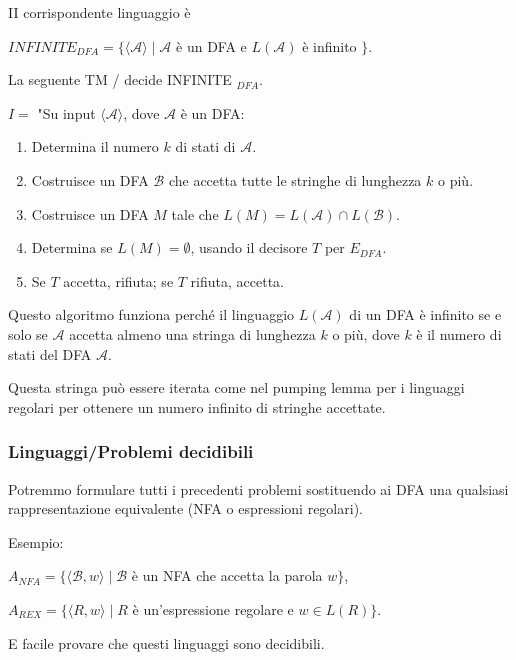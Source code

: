 II corrispondente linguaggio è

$I N F I N I T E_{D F A}=\{\langle\mathcal{A}\rangle \mid \mathcal{A}$ è un DFA e $L(\mathcal{A})$ è infinito $\} .$

\vspace{5mm}

La seguente TM / decide INFINITE $_{D F A}$.

$I=$ "Su input $\langle\mathcal{A}\rangle$, dove $\mathcal{A}$ è un DFA:
\begin{enumerate}
    \item Determina il numero $k$ di stati di $\mathcal{A}$.
    \item Costruisce un DFA $\mathcal{B}$ che accetta tutte le stringhe di lunghezza $k$ o più.
    \item Costruisce un DFA $M$ tale che $L(M)=L(\mathcal{A}) \cap L(\mathcal{B})$.
    \item Determina se $L(M)=\emptyset$, usando il decisore $T$ per $E_{D F A}$.
    \item Se $T$ accetta, rifiuta; se $T$ rifiuta, accetta.
\end{enumerate}

Questo algoritmo funziona perché il linguaggio $L(\mathcal{A})$ di un DFA è infinito se e solo se $\mathcal{A}$ accetta almeno una stringa di lunghezza $k$ o più, dove $k$ è il numero di stati del DFA $\mathcal{A}$.

Questa stringa può essere iterata come nel pumping lemma per i linguaggi regolari per ottenere un numero infinito di stringhe accettate.

\subsubsection{Linguaggi/Problemi decidibili}

Potremmo formulare tutti i precedenti problemi sostituendo ai DFA una qualsiasi rappresentazione equivalente (NFA o espressioni regolari).

\vspace{5mm}

Esempio:


$A_{N F A}=\{\langle\mathcal{B}, w\rangle \mid \mathcal{B}$ è un NFA che accetta la parola $w\}$,


$A_{R E X}=\{\langle R, w\rangle \mid R$ è un'espressione regolare e $w \in L(R)\}$.

\vspace{5mm}

E facile provare che questi linguaggi sono decidibili.

